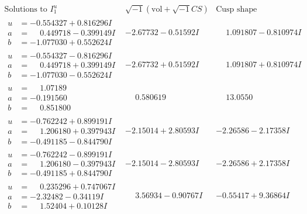 \documentclass[1p]{elsarticle_modified}
\theoremstyle{definition}
\newcommand{\I}{\sqrt{-1}}
\begin{document}
$$\begin{array}{c|c|c}  
\text{Solutions to }I^u_{1}& \I (\text{vol} + \sqrt{-1}CS) & \text{Cusp shape}\\
 \hline 
\begin{aligned}
u &= -0.554327 + 0.816296 I \\
a &= \phantom{-}0.449718 - 0.399149 I \\
b &= -1.077030 + 0.552624 I\end{aligned}
 & -2.67732 - 0.51592 I & \phantom{-}1.091807 - 0.810974 I \\ \hline\begin{aligned}
u &= -0.554327 - 0.816296 I \\
a &= \phantom{-}0.449718 + 0.399149 I \\
b &= -1.077030 - 0.552624 I\end{aligned}
 & -2.67732 + 0.51592 I & \phantom{-}1.091807 + 0.810974 I \\ \hline\begin{aligned}
u &= \phantom{-}1.07189\phantom{ +0.000000I} \\
a &= -0.191560\phantom{ +0.000000I} \\
b &= \phantom{-}0.851800\phantom{ +0.000000I}\end{aligned}
 & \phantom{-}0.580619\phantom{ +0.000000I} & \phantom{-}13.0550\phantom{ +0.000000I} \\ \hline\begin{aligned}
u &= -0.762242 + 0.899191 I \\
a &= \phantom{-}1.206180 + 0.397943 I \\
b &= -0.491185 - 0.844790 I\end{aligned}
 & -2.15014 + 2.80593 I & -2.26586 - 2.17358 I \\ \hline\begin{aligned}
u &= -0.762242 - 0.899191 I \\
a &= \phantom{-}1.206180 - 0.397943 I \\
b &= -0.491185 + 0.844790 I\end{aligned}
 & -2.15014 - 2.80593 I & -2.26586 + 2.17358 I \\ \hline\begin{aligned}
u &= \phantom{-}0.235296 + 0.747067 I \\
a &= -2.32482 - 0.34119 I \\
b &= \phantom{-}1.52404 + 0.10128 I\end{aligned}
 & \phantom{-}3.56934 - 0.90767 I & -0.55417 + 9.36864 I \\ \hline\begin{aligned}

\end{aligned}
\end{array}$$
\end{document}
